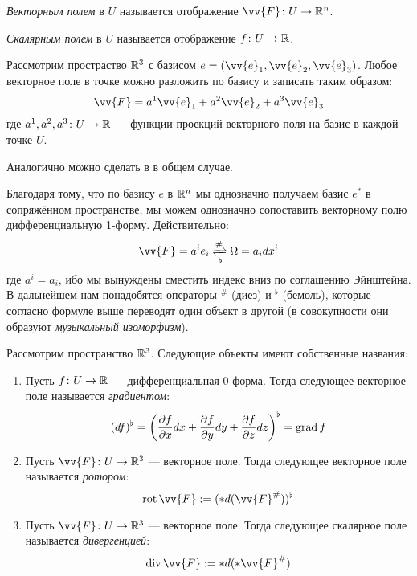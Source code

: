 \begin{definition}
	\textit{Векторным полем} в $U$ называется отображение $\vv{F} \colon U \to \R^n$.
\end{definition}

\begin{definition}
	\textit{Скалярным полем} в $U$ называется отображение $f \colon U \to \mathbb{R}$.
\end{definition}

\begin{example}
	Рассмотрим простраство $\mathbb{R}^3$ с базисом $e = (\vv{e}_1, \vv{e}_2, \vv{e}_3)$. Любое векторное поле в точке можно разложить по базису и записать таким образом:
	\[
		\vv{F} = a^1\vv{e}_1 + a^2\vv{e}_2 + a^3\vv{e}_3
	\]
	где $a^1, a^2, a^3 \colon U \to \mathbb{R}$ --- функции проекций векторного поля на базис в каждой точке $U$.
	
	Аналогично можно сделать в в общем случае.
\end{example}

\begin{note}
	Благодаря тому, что по базису $e$ в $\mathbb{R}^n$ мы однозначно получаем базис $e^*$ в сопряжённом пространстве, мы можем однозначно сопоставить векторному полю дифференциальную 1-форму. Действительно:
	\[
		\vv{F} = a^i e_i \xrightleftharpoons[\flat]{\#} \Omega = a_i dx^i
	\]
	где $a^i = a_i$, ибо мы вынуждены сместить индекс вниз по соглашению Эйнштейна. В дальнейшем нам понадобятся операторы ${}^\#$ (диез) и ${}^\flat$ (бемоль), которые согласно формуле выше переводят один объект в другой (в совокупности они образуют \textit{музыкальный изоморфизм}).
\end{note}

\begin{definition}
	Рассмотрим пространство $\mathbb{R}^3$. Следующие объекты имеют собственные названия:
	\begin{enumerate}
		\item Пусть $f \colon U \to \mathbb{R}$ --- дифференциальная 0-форма. Тогда следующее векторное поле называется \textit{градиентом}:
		\[
			(df)^\flat = \left(\frac{\partial f}{\partial x}dx + \frac{\partial f}{\partial y}dy + \frac{\partial f}{\partial z}dz\right)^\flat = \operatorname{grad} f
		\]
		
		\item Пусть $\vv{F} \colon U \to \R^3$ --- векторное поле. Тогда следующее векторное поле называется \textit{ротором}:
		\[
			\rot \vv{F} := (*d(\vv{F}^\#))^\flat
		\]
		
		\item Пусть $\vv{F} \colon U \to \R^3$ --- векторное поле. Тогда следующее скалярное поле называется \textit{дивергенцией}:
		\[
			\Div \vv{F} := *d(*\vv{F}^\#)
		\]
	\end{enumerate}
\end{definition}

